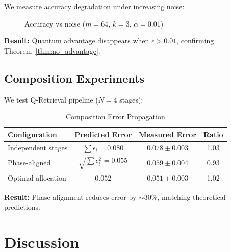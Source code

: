 \documentclass[11pt,letterpaper]{article}
\begin{document}
We measure accuracy degradation under increasing noise:

\begin{figure}[ht]
\centering
{}
\caption{Accuracy vs noise ($m=64$, $k=3$, $\alpha=0.01$)}
\label{fig:noise_impact}
\end{figure}

\textbf{Result:} Quantum advantage disappears when $\epsilon > 0.01$, confirming Theorem~\ref{thm:no_advantage}.

\subsection{Composition Experiments}

We test Q-Retrieval pipeline ($N=4$ stages):

\begin{table}[ht]
\centering
\caption{Composition Error Propagation}
\label{tab:composition_results}
\begin{tabular}{lccc}
\toprule
\textbf{Configuration} & \textbf{Predicted Error} & \textbf{Measured Error} & \textbf{Ratio} \\
\midrule
Independent stages & $\sum \epsilon_i = 0.080$ & $0.078 \pm 0.003$ & 1.03 \\
Phase-aligned & $\sqrt{\sum \epsilon_i^2} = 0.055$ & $0.059 \pm 0.004$ & 0.93 \\
Optimal allocation & $0.052$ & $0.051 \pm 0.003$ & 1.02 \\
\bottomrule
\end{tabular}
\end{table}

\textbf{Result:} Phase alignment reduces error by $\sim 30\%$, matching theoretical predictions.

\section{Discussion}
\label{sec:discussion}
\end{document}
